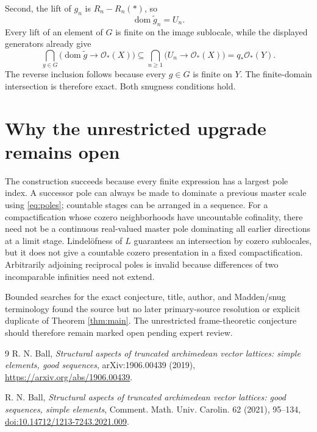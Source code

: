 \documentclass[11pt]{article}
\newcommand{\cO}{\mathcal{O}}
\begin{document}
Second, the lift of \(g_n\) is \(R_n-R_n(*)\), so
\[
 \operatorname{dom}\widetilde g_n=U_n.
\]
Every lift of an element of \(G\) is finite on the image sublocale, while the
displayed generators already give
\[
 \bigcap_{g\in G}
 \bigl(\operatorname{dom}\widetilde g\to\cO_*(X)\bigr)
 \subseteq
 \bigcap_{n\geq1}\bigl(U_n\to\cO_*(X)\bigr)
 =q_*\cO_*(Y).
\]
The reverse inclusion follows because every \(g\in G\) is finite on \(Y\).
The finite-domain intersection is therefore exact.  Both snugness conditions
hold.

\section{Why the unrestricted upgrade remains open}

The construction succeeds because every finite expression has a largest pole
index.  A successor pole can always be made to dominate a previous master
scale using \eqref{eq:poles}; countable stages can be arranged in a sequence.
For a compactification whose cozero neighborhoods have uncountable cofinality,
there need not be a continuous real-valued master pole dominating all earlier
directions at a limit stage.  Lindel\"ofness of \(L\) guarantees an intersection
by cozero sublocales, but it does not give a countable cozero presentation in a
fixed compactification.  Arbitrarily adjoining reciprocal poles is invalid
because differences of two incomparable infinities need not extend.

Bounded searches for the exact conjecture, title, author, and Madden/snug
terminology found the source but no later primary-source resolution or explicit
duplicate of Theorem \ref{thm:main}.  The unrestricted frame-theoretic
conjecture should therefore remain marked open pending expert review.

\begin{thebibliography}{9}
R. N. Ball,
\emph{Structural aspects of truncated archimedean vector lattices: simple
elements, good sequences}, arXiv:1906.00439 (2019),
\url{https://arxiv.org/abs/1906.00439}.

R. N. Ball,
\emph{Structural aspects of truncated archimedean vector lattices: good
sequences, simple elements}, Comment. Math. Univ. Carolin. 62 (2021), 95--134,
\href{https://doi.org/10.14712/1213-7243.2021.009}{doi:10.14712/1213-7243.2021.009}.
\end{thebibliography}
\end{document}

